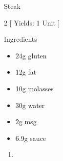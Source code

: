 \begin{Large}
    Steak
\end{Large}

\begin{scriptsize}
\begin{multicols}{2}
[
\vspace{1em}
Yields: 1 Unit
\vspace{-1.5em}
]

Ingredients
\begin{itemize}
    \item 24g gluten
    \item 12g fat
    \item 10g molasses
    \item 30g water
    \item 2g msg
    \item 6.9g sauce
\end{itemize}
\end{multicols}
\end{scriptsize}

\begin{footnotesize}
\begin{enumerate}
    \item 
\end{enumerate}
\end{footnotesize}

\vspace{2em}
